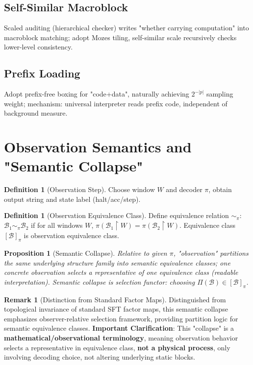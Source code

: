 \documentclass[12pt]{article}
\theoremstyle{plain}
\newtheorem{proposition}[theorem]{Proposition}
\theoremstyle{definition}
\newtheorem{definition}[theorem]{Definition}
\newtheorem{remark}[theorem]{Remark}
\begin{document}
\subsection{Self-Similar Macroblock}

Scaled auditing (hierarchical checker) writes "whether carrying computation" into macroblock matching; adopt Mozes tiling, self-similar scale recursively checks lower-level consistency.

\subsection{Prefix Loading}

Adopt prefix-free boxing for "code+data", naturally achieving $2^{-|p|}$ sampling weight; mechanism: universal interpreter reads prefix code, independent of background measure.

\section{Observation Semantics and "Semantic Collapse"}

\begin{definition}[Observation Step]
Choose window $W$ and decoder $\pi$, obtain output string and state label (halt/acc/step).
\end{definition}

\begin{definition}[Observation Equivalence Class]
Define equivalence relation $\sim_\pi$: $\mathcal{B}_1 \sim_\pi \mathcal{B}_2$ if for all windows $W$, $\pi(\mathcal{B}_1 \upharpoonright W) = \pi(\mathcal{B}_2 \upharpoonright W)$. Equivalence class $[\mathcal{B}]_\pi$ is observation equivalence class.
\end{definition}

\begin{proposition}[Semantic Collapse]
Relative to given $\pi$, "observation" partitions the same underlying structure family into semantic equivalence classes; one concrete observation selects a representative of one equivalence class (readable interpretation). Semantic collapse is selection functor: choosing $\Pi(\mathcal{B}) \in [\mathcal{B}]_\pi$.
\end{proposition}

\begin{remark}[Distinction from Standard Factor Maps]
Distinguished from topological invariance of standard SFT factor maps, this semantic collapse emphasizes observer-relative selection framework, providing partition logic for semantic equivalence classes. \textbf{Important Clarification}: This "collapse" is a \textbf{mathematical/observational terminology}, meaning observation behavior selects a representative in equivalence class, \textbf{not a physical process}, only involving decoding choice, not altering underlying static blocks.
\end{remark}
\end{document}
